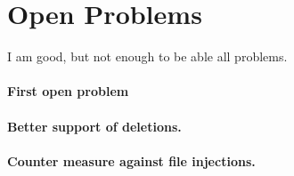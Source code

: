

\section{Open Problems} %
\label{sec:open_problems}

I am good, but not enough to be able all problems.

\paragraph{First open problem} %
\label{par:problem_1}

\lipsum[1]


\paragraph{Better support of deletions.} %
\label{par:problem_2}

\lipsum[2]



\paragraph{Counter measure against file injections.} %
\label{par:problem_3}

\lipsum[3]


